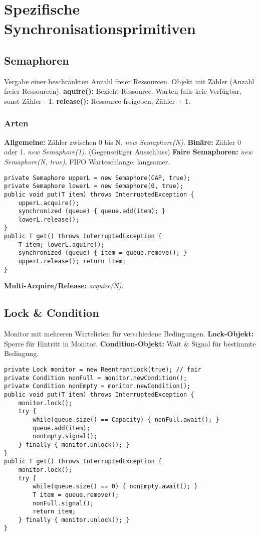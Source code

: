 \section{Spezifische Synchronisationsprimitiven}
\subsection{Semaphoren}
Vergabe einer beschränkten Anzahl freier Ressourcen. Objekt mit Zähler (Anzahl freier Ressourcen).
\textbf{aquire():} Bezieht Ressource. Warten falls keie Verfügbar, sonst Zähler - 1.
\textbf{release():} Ressource freigeben, Zähler + 1.
\subsubsection{Arten}
\textbf{Allgemeine:} Zähler zwischen 0 bis N.
\textit{new Semaphore(N)}.
\textbf{Binäre:} Zähler 0 oder 1. \textit{new Semaphore(1)}. (Gegenseitiger Ausschluss)
\textbf{Faire Semaphoren:} \textit{new Semaphore(N, true)}, FIFO Warteschlange, langsamer.

\begin{lstlisting}
private Semaphore upperL = new Semaphore(CAP, true);
private Semaphore lowerL = new Semaphore(0, true);
public void put(T item) throws InterruptedException {
    upperL.acquire();
    synchronized (queue) { queue.add(item); }
    lowerL.release();
}
public T get() throws InterruptedException {
    T item; lowerL.aquire();
    synchronized (queue) { item = queue.remove(); }
    upperL.release(); return item;
}
\end{lstlisting}
\textbf{Multi-Acquire/Release:} \textit{acquire(N)}.

\subsection{Lock \& Condition}
Monitor mit mehreren Wartelisten für verschiedene Bedingungen.
\textbf{Lock-Objekt:} Sperre für Eintritt in Monitor.
\textbf{Condition-Objekt:} Wait \& Signal für bestimmte Bedingung.

\begin{lstlisting}
private Lock monitor = new ReentrantLock(true); // fair
private Condition nonFull = monitor.newCondition();
private Condition nonEmpty = monitor.newCondition();
public void put(T item) throws InterruptedException {
    monitor.lock();
    try {
        while(queue.size() == Capacity) { nonFull.await(); }
        queue.add(item);
        nonEmpty.signal();
    } finally { monitor.unlock(); }
}
public T get() throws InterruptedException {
    monitor.lock();
    try {
        while(queue.size() == 0) { nonEmpty.await(); }
        T item = queue.remove();
        nonFull.signal();
        return item;
    } finally { monitor.unlock(); }
}
\end{lstlisting}

